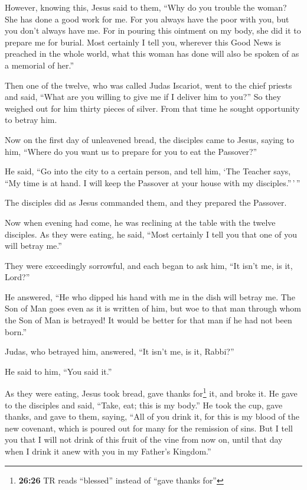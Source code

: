  However, knowing this, Jesus said to them, ``Why do you
trouble the woman? She has done a good work for me.  For
you always have the poor with you, but you don't always have me.
 For in pouring this ointment on my body, she did it to
prepare me for burial.  Most certainly I tell you,
wherever this Good News is preached in the whole world, what this woman
has done will also be spoken of as a memorial of her.''

 Then one of the twelve, who was called Judas Iscariot,
went to the chief priests  and said, ``What are you
willing to give me if I deliver him to you?'' So they weighed out for
him thirty pieces of silver.  From that time he sought
opportunity to betray him.

 Now on the first day of unleavened bread, the disciples
came to Jesus, saying to him, ``Where do you want us to prepare for you
to eat the Passover?''

 He said, ``Go into the city to a certain person, and
tell him, `The Teacher says, ``My time is at hand. I will keep the
Passover at your house with my disciples.''\,'\,''

 The disciples did as Jesus commanded them, and they
prepared the Passover.

 Now when evening had come, he was reclining at the table
with the twelve disciples.  As they were eating, he said,
``Most certainly I tell you that one of you will betray me.''

 They were exceedingly sorrowful, and each began to ask
him, ``It isn't me, is it, Lord?''

 He answered, ``He who dipped his hand with me in the
dish will betray me.  The Son of Man goes even as it is
written of him, but woe to that man through whom the Son of Man is
betrayed! It would be better for that man if he had not been born.''

 Judas, who betrayed him, answered, ``It isn't me, is it,
Rabbi?''

He said to him, ``You said it.''

 As they were eating, Jesus took bread, gave thanks
for\footnote{\textbf{26:26} TR reads ``blessed'' instead of ``gave
  thanks for''} it, and broke it. He gave to the disciples and said,
``Take, eat; this is my body.''  He took the cup, gave
thanks, and gave to them, saying, ``All of you drink it, 
for this is my blood of the new covenant, which is poured out for many
for the remission of sins.  But I tell you that I will
not drink of this fruit of the vine from now on, until that day when I
drink it anew with you in my Father's Kingdom.''

